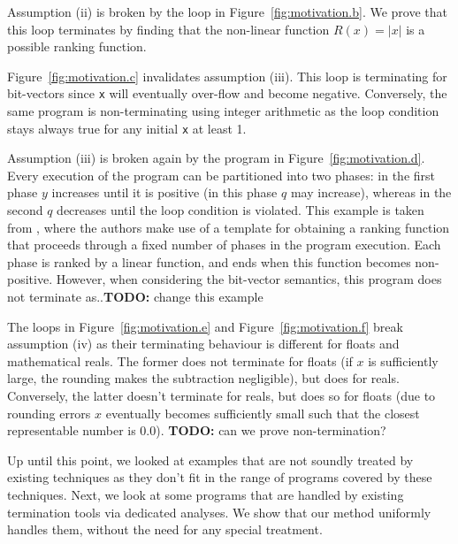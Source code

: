 \documentclass[preprint]{sigplanconf}
\theoremstyle{definition}
\newcommand{\todo}[1]{{\bf TODO:} #1}
\begin{document}
Assumption (ii) is broken by the loop in Figure~\ref{fig:motivation.b}.
We prove that this loop terminates by finding that the non-linear function $R(x) = |x|$ is a possible ranking function.

Figure~\ref{fig:motivation.c} invalidates assumption (iii). 
This loop is  terminating for bit-vectors since \texttt{x}
will eventually over-flow and become negative. Conversely, the same program is non-terminating using integer
arithmetic as the loop condition stays always true for any initial \texttt{x} at least 1.

Assumption (iii) is broken again by the program in Figure~\ref{fig:motivation.d}. Every execution of the program can be partitioned into two phases: 
in the first phase $y$ increases until it is positive (in this phase $q$ may increase), whereas in the second $q$ decreases until the loop condition is violated. 
This example is taken from \cite{DBLP:conf/tacas/LeikeH14}, where the authors make use of a template for obtaining a ranking function that proceeds
through a fixed number of phases in the program execution. Each phase is ranked by a linear function, and ends when this function becomes non-positive.
However, when considering the bit-vector semantics, this program does not terminate as..\todo{change this example}

The loops in Figure~\ref{fig:motivation.e} and Figure~\ref{fig:motivation.f} break assumption (iv) as their terminating behaviour is different 
for floats and mathematical reals. 
The former does not terminate for floats (if $x$ is sufficiently large, the rounding makes the subtraction negligible), but does for reals. Conversely, the latter 
doesn't terminate for reals, but does so for floats (due to rounding errors $x$ eventually becomes sufficiently small 
such that the closest representable number is 0.0). \todo{can we prove non-termination?}


Up until this point, we looked at examples that are not soundly treated by existing techniques as they 
don't fit in the range of programs covered by these techniques.
Next, we look at some programs that are handled by existing termination tools via dedicated analyses. We show that our method 
uniformly handles them, without the need for any special treatment.

\end{document}
